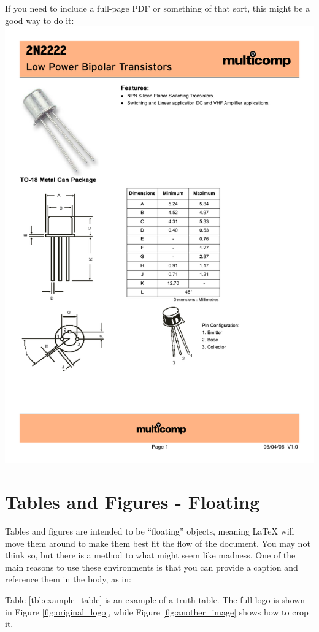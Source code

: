 \documentclass[11pt]{article}
\begin{document}
If you need to include a full-page PDF or something of that sort, this might be a good way to do it:
\includegraphics[width=\textwidth]{"2N2222 TO-18"}


\section*{Tables and Figures - Floating}

Tables and figures are intended to be ``floating'' objects, meaning LaTeX will move them around to make them best fit the flow of the document.  You may not think so, but there is a method to what might seem like madness. One of the main reasons to use these environments is that you can provide a caption and reference them in the body, as in: 

Table \ref{tbl:example_table} is an example of a truth table. The full logo is shown in Figure \ref{fig:original_logo}, while Figure \ref{fig:another_image} shows how to crop it.
\end{document}
